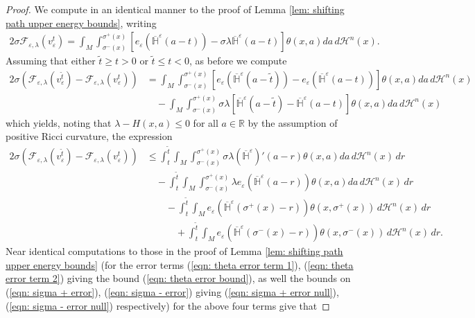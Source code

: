 \documentclass[11pt]{article}
\begin{document}
\begin{proof}
We compute in an identical manner to the proof of Lemma \ref{lem: shifting path upper energy bounds}, writing
\begin{align*}
    2\sigma \mathcal{F}_{\varepsilon,\lambda}(v^t_\varepsilon) = \int_M \int_{\sigma^-(x)}^{\sigma^+(x)} \left[e_\varepsilon\left(\overline{\mathbb{H}}^\varepsilon(a - t)\right) - \sigma\lambda\overline{\mathbb{H}}^\varepsilon(a - t) \right]\theta(x,a) da\, d\mathcal{H}^n(x).
\end{align*}
Assuming that either $\tilde{t} \geq t > 0$ or $\tilde{t} \leq t < 0$, as before we compute
\begin{align*}
    2\sigma(\mathcal{F}_{\varepsilon,\lambda}(v^{\tilde{t}}_\varepsilon) - \mathcal{F}_{\varepsilon,\lambda}(v^t_\varepsilon)) &= \int_M \int_{\sigma^-(x)}^{\sigma^+(x)} \left[e_\varepsilon\left(\overline{\mathbb{H}}^\varepsilon(a - \tilde{t})\right) - e_\varepsilon\left(\overline{\mathbb{H}}^\varepsilon(a - t)\right) \right]\theta(x,a) da\, d\mathcal{H}^n(x)\\
    \label{eqn: 1d term}
    &\quad -\int_M \int_{\sigma^-(x)}^{\sigma^+(x)} \sigma\lambda\left[\overline{\mathbb{H}}^\varepsilon(a - \tilde{t}) - \overline{\mathbb{H}}^\varepsilon(a - t) \right]\theta(x,a) da\, d\mathcal{H}^n(x)
\end{align*}
which yields, noting that $\lambda - H(x,a) \leq 0$ for all $a \in \mathbb{R}$ by the assumption of positive Ricci curvature, the expression
\begin{align*}
     2\sigma(\mathcal{F}_{\varepsilon,\lambda}(v^{\tilde{t}}_\varepsilon) - \mathcal{F}_{\varepsilon,\lambda}(v^t_\varepsilon)) &\leq  \int_t^{\tilde{t}} \int_M \int_{\sigma^-(x)}^{\sigma^+(x)} \sigma\lambda  (\overline{\mathbb{H}}^\varepsilon)'(a - r)\theta(x,a) da\,d\mathcal{H}^n(x)\,dr\\
     &\quad - \int_t^{\tilde{t}} \int_M \int_{\sigma^-(x)}^{\sigma^+(x)} \lambda e_\varepsilon(\overline{\mathbb{H}}^\varepsilon(a - r)) \theta(x,a) da \, d\mathcal{H}^n(x) \, dr\\
     &\quad\quad -\int_t^{\tilde{t}} \int_M e_\varepsilon\left(\overline{\mathbb{H}}^\varepsilon(\sigma^+(x) - r)\right)\theta(x,\sigma^+(x)) \, d\mathcal{H}^n(x)\,dr\\
     &\quad\quad\quad +\int_t^{\tilde{t}} \int_M e_\varepsilon\left(\overline{\mathbb{H}}^\varepsilon(\sigma^-(x) - r)\right)\theta(x,\sigma^-(x)) \, d\mathcal{H}^n(x)\,dr.
\end{align*}
Near identical computations to those in the proof of Lemma \ref{lem: shifting path upper energy bounds} (for the error terms (\ref{eqn: theta error term 1}), (\ref{eqn: theta error term 2}) giving the bound (\ref{eqn: theta error bound}), as well the bounds on (\ref{eqn: sigma + error}), (\ref{eqn: sigma - error}) giving (\ref{eqn: sigma + error null}), (\ref{eqn: sigma - error null}) respectively) for the above four terms give that 

\end{proof}
\end{document}
